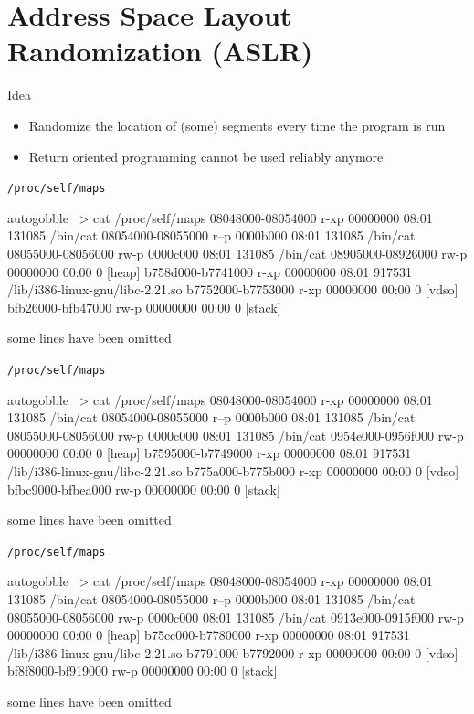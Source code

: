 \documentclass[beamer]{uibk}
\begin{document}
\section{Address Space Layout Randomization (ASLR)}

\begin{frame}{Idea}
    \begin{itemize}
        \item Randomize the location of (some) segments every time the program
            is run
        \bigskip
        \pause
        \item Return oriented programming cannot be used reliably anymore
    \end{itemize}
\end{frame}

\begin{frame}[fragile]{\texttt{/proc/self/maps}}
    \begin{pre*}{autogobble}
        ~> cat /proc/self/maps
        08048000-08054000 r-xp 00000000 08:01 131085     /bin/cat
        08054000-08055000 r--p 0000b000 08:01 131085     /bin/cat
        08055000-08056000 rw-p 0000c000 08:01 131085     /bin/cat
        08905000-08926000 rw-p 00000000 00:00 0          [heap]
        b758d000-b7741000 r-xp 00000000 08:01 917531     /lib/i386-linux-gnu/libc-2.21.so
        b7752000-b7753000 r-xp 00000000 00:00 0          [vdso]
        bfb26000-bfb47000 rw-p 00000000 00:00 0          [stack]
    \end{pre*}
    \bigskip
    some lines have been omitted
\end{frame}
\begin{frame}[fragile]{\texttt{/proc/self/maps}}
    \begin{pre*}{autogobble}
        ~> cat /proc/self/maps
        08048000-08054000 r-xp 00000000 08:01 131085     /bin/cat
        08054000-08055000 r--p 0000b000 08:01 131085     /bin/cat
        08055000-08056000 rw-p 0000c000 08:01 131085     /bin/cat
        0954e000-0956f000 rw-p 00000000 00:00 0          [heap]
        b7595000-b7749000 r-xp 00000000 08:01 917531     /lib/i386-linux-gnu/libc-2.21.so
        b775a000-b775b000 r-xp 00000000 00:00 0          [vdso]
        bfbc9000-bfbea000 rw-p 00000000 00:00 0          [stack]
    \end{pre*}
    \bigskip
    some lines have been omitted
\end{frame}
\begin{frame}[fragile]{\texttt{/proc/self/maps}}
    \begin{pre*}{autogobble}
        ~> cat /proc/self/maps
        08048000-08054000 r-xp 00000000 08:01 131085     /bin/cat
        08054000-08055000 r--p 0000b000 08:01 131085     /bin/cat
        08055000-08056000 rw-p 0000c000 08:01 131085     /bin/cat
        0913e000-0915f000 rw-p 00000000 00:00 0          [heap]
        b75cc000-b7780000 r-xp 00000000 08:01 917531     /lib/i386-linux-gnu/libc-2.21.so
        b7791000-b7792000 r-xp 00000000 00:00 0          [vdso]
        bf8f8000-bf919000 rw-p 00000000 00:00 0          [stack]
    \end{pre*}
    \bigskip
    some lines have been omitted
\end{frame}
\end{document}
